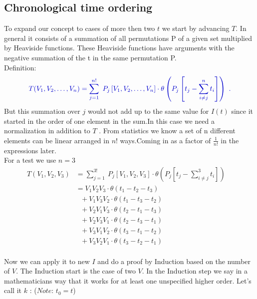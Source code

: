 \documentclass[12pt, titlepage]{article}
\begin{document}
\begin{subappendices}
\subsection{Chronological time ordering}\label{chronological_time}
To expand our concept to cases of more then  two $  t $ we start by advancing $ T $.
In general it consists of a summation of all permutations P of a given set multiplied by Heaviside functions. These Heaviside functions have arguments with the negative summation of the t in the same permutation P.\\
Definition:
\begin{equation}\textcolor[RGB]{0,0,204}{
T(V_1, V_2,\ldots,V_n)=
\sum_{j=1}^{n!}\ P_{j}
\left[
V_1, V_2,\ldots,V_n
 \right]  
\cdot
\theta \left(P_{j}\left[t_{j} -\sum_{i\neq j}^{n} t_{i}\right]\right)\ .
}
\end{equation}
But this summation over $ j $ would not add up to the same value for $ I(t) $ since it started in the order of one element in the sum.In this case we need a normalization in addition to $ T $ . From statistics we know a set of n different elements can be linear arranged in $ n! $ ways.Coming in as a factor of $ \frac{1}{n!} $ in the expressions later.
\\
For a test we use $ n=3 $
\begin{subequations}
\begin{align}
T(V_1, V_2,V_3)
&=
\sum_{j=1}^{3!}\ P_{j}
\left[
V_1, V_2,V_3
 \right]  
\cdot
\theta \left(P_{j}\left[t_{j} -\sum_{i\neq j}^{3} t_{i}\right]\right)\
&\\
&=V_{1}V_{2}V_{3}\cdot \theta(t_{1}-t_{2}-t_{3})
	&\\
	& \ \ \ +V_{1}V_{3}V_{2} \cdot \theta(t_{1}-t_{3}-t_{2})
	&\\
	& \ \ \ +V_{2}V_{1}V_{3} \cdot \theta(t_{2}-t_{1}-t_{3})
	&\\
	& \ \ \ +V_{2}V_{3}V_{1} \cdot \theta(t_{2}-t_{3}-t_{1})
	&\\
	& \ \ \ +V_{3}V_{1}V_{2} \cdot \theta(t_{3}-t_{1}-t_{2})
	&\\
	& \ \ \ +V_{3}V_{2}V_{1} \cdot \theta(t_{3}-t_{2}-t_{1})
\end{align}
\end{subequations}
\\
Now we can apply it to new $ I $ and do a proof by Induction based on the number of $ V $. The Induction start is the case of two $ V $. In the Induction step we say in a mathematicians way that it works for at least one unspecified higher order. Let's call it $ k $ : ($ \textit{Note:} $ $ t_0 = t $)\\

\end{subappendices}
\end{document}
